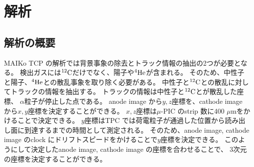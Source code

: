 \documentclass[../master]{subfiles}
\begin{document}
\chapter{解析}
%
%
%
\section{解析の概要}
MAIKo TCP の解析では背景事象の除去とトラック情報の抽出の2つが必要となる。
検出ガスには${}^{12}{\rm C}$だけでなく、陽子や${}^{4}{\rm He}$が含まれる。
そのため、中性子と陽子、${}^{4}{\rm He}$との散乱事象を取り除く必要がある。
中性子と${}^{12}{\rm C}$との散乱に対してトラックの情報を抽出する。
トラックの情報は中性子と${}^{12}{\rm C}$とが散乱した座標、
$\alpha$粒子が停止した点である。
anode image から$y, z$座標を、cathode image から$x, y$座標を決定することができる。
$x, z$座標は$\mu$-PIC のstrip 数に400 $\mu$mをかけることで決定できる。
$y$座標はTPC では荷電粒子が通過した位置から読み出し面に到達するまでの時間として測定される。
そのため、anode image, cathode image のclock にドリフトスピードをかけることで$y$座標を決定できる。
このようにして決定したanode image, cathode image の座標を合わせることで、
3次元の座標を決定することができる。
\end{document}
